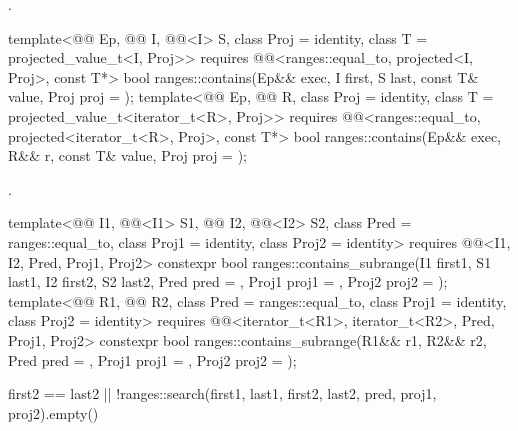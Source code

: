 \begin{itemdescr}
\pnum
\returns
{}.
\end{itemdescr}

\begin{itemdecl}
template<@@ Ep, @@ I, @@<I> S,
         class Proj = identity, class T = projected_value_t<I, Proj>>
  requires @@<ranges::equal_to, projected<I, Proj>, const T*>
  bool ranges::contains(Ep&& exec, I first, S last, const T& value, Proj proj = {});
template<@@ Ep, @@ R, class Proj = identity,
         class T = projected_value_t<iterator_t<R>, Proj>>
  requires
    @@<ranges::equal_to, projected<iterator_t<R>, Proj>, const T*>
  bool ranges::contains(Ep&& exec, R&& r, const T& value, Proj proj = {});
\end{itemdecl}

\begin{itemdescr}
\pnum
\returns
{}.
\end{itemdescr}

%
\begin{itemdecl}
template<@@ I1, @@<I1> S1,
         @@ I2, @@<I2> S2,
         class Pred = ranges::equal_to, class Proj1 = identity, class Proj2 = identity>
  requires @@<I1, I2, Pred, Proj1, Proj2>
  constexpr bool ranges::contains_subrange(I1 first1, S1 last1, I2 first2, S2 last2,
                                           Pred pred = {}, Proj1 proj1 = {}, Proj2 proj2 = {});
template<@@ R1, @@ R2,
         class Pred = ranges::equal_to, class Proj1 = identity, class Proj2 = identity>
  requires @@<iterator_t<R1>, iterator_t<R2>, Pred, Proj1, Proj2>
  constexpr bool ranges::contains_subrange(R1&& r1, R2&& r2, Pred pred = {},
                                           Proj1 proj1 = {}, Proj2 proj2 = {});
\end{itemdecl}

\begin{itemdescr}
\pnum
\returns
\begin{codeblock}
first2 == last2 || !ranges::search(first1, last1, first2, last2,
                                   pred, proj1, proj2).empty()
\end{codeblock}
\end{itemdescr}

